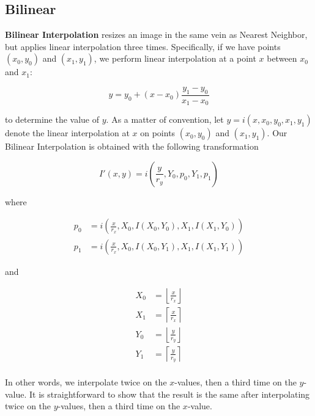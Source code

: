 \subsection{Bilinear} \label{subsec:bilinear}

\textbf{Bilinear Interpolation} resizes an image in the same vein as Nearest Neighbor, but applies linear interpolation three times. Specifically, if we have points $(x_0, y_0)$ and $(x_1, y_1)$, we perform linear interpolation at a point $x$ between $x_0$ and $x_1$:

\[y = y_0+(x-x_0)\frac{y_1-y_0}{x_1-x_0}\]

to determine the value of $y$. As a matter of convention, let $y=i(x,x_0, y_0, x_1, y_1)$ denote the linear interpolation at $x$ on points $(x_0, y_0)$ and $(x_1, y_1)$. Our Bilinear Interpolation is obtained with the following transformation

\[I'(x, y) = i\left(\frac{y}{r_y}, Y_0, p_0, Y_1, p_1\right)\]

where

\begin{align*}
    p_0 &= i\left(\frac{x}{r_x}, X_0, I(X_0, Y_0), X_1, I(X_1, Y_0)\right)\\
    p_1 &= i\left(\frac{x}{r_x}, X_0, I(X_0, Y_1), X_1, I(X_1, Y_1)\right)
\end{align*}

and

\begin{align*}
    X_0&=\left\lfloor\frac{x}{r_x}\right\rfloor\\
    X_1&=\left\lceil\frac{x}{r_x}\right\rceil\\
    Y_0&=\left\lfloor\frac{y}{r_y}\right\rfloor\\
    Y_1&=\left\lceil\frac{y}{r_y}\right\rceil\\
\end{align*}

In other words, we interpolate twice on the $x$-values, then a third time on the $y$-value. It is straightforward to show that the result is the same after interpolating twice on the $y$-values, then a third time on the $x$-value.

